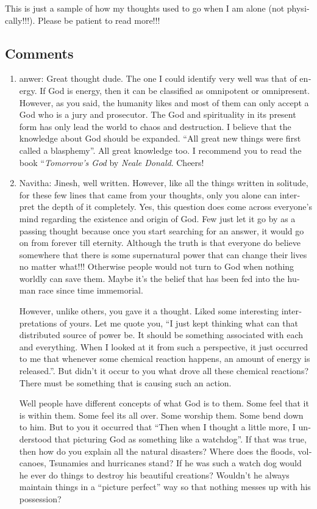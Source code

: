 \begin{english}
This is just a sample of how my thoughts used to go when I am alone (not physically!!!). Please be patient to read more!!!

\subsection*{Comments}
\begin{enumerate}
\item{anwer: }
Great thought dude. The one I could identify very well was that of energy. If God is energy, then it can be classified as omnipotent or omnipresent. However, as you said, the humanity likes and most of them can only accept a God who is a jury and prosecutor. The God and spirituality in its present form has only lead the world to chaos and destruction. I believe that the knowledge about God should be expanded. ``All great new things were first called a blasphemy''. All great knowledge too. I recommend you to read the book ``\emph{Tomorrow's God} by \emph{Neale Donald}. Cheers!

\item{Navitha: }
Jinesh, well written. However, like all the things written in solitude, for these few lines that came from your thoughts, only you alone can interpret the depth of it completely. Yes, this question does come across everyone's mind regarding the existence and origin of God. Few just let it go by as a passing thought because once you start searching for an answer, it would go on from forever till eternity. Although the truth is that everyone do believe somewhere that there is some supernatural power that can change their lives no matter what!!! Otherwise people would not turn to God when nothing worldly can save them. Maybe it's the belief that has been fed into the human race since time immemorial.

However, unlike others, you gave it a thought. Liked some interesting interpretations of yours.
Let me quote you, ``I just kept thinking what can that distributed source of power be. It should be something associated with each and everything. When I looked at it from such a perspective, it just occurred to me that whenever some chemical reaction happens, an amount of energy is released.''. But didn't it occur to you what drove all these chemical reactions? There must be something that is causing such an action.

Well people have different concepts of what God is to them. Some feel that it is within them. Some feel its all over. Some worship them. Some bend down to him.
But to you it occurred that “Then when I thought a little more, I understood that picturing God as something like a watchdog”. If that was true, then how do you explain all the natural disasters? Where does the floods, volcanoes, Tsunamies and hurricanes stand? If he was such a watch dog would he ever do things to destroy his beautiful creations? Wouldn't he always maintain things in a ``picture perfect'' way so that nothing messes up with his possession?



\end{enumerate}
\end{english}
